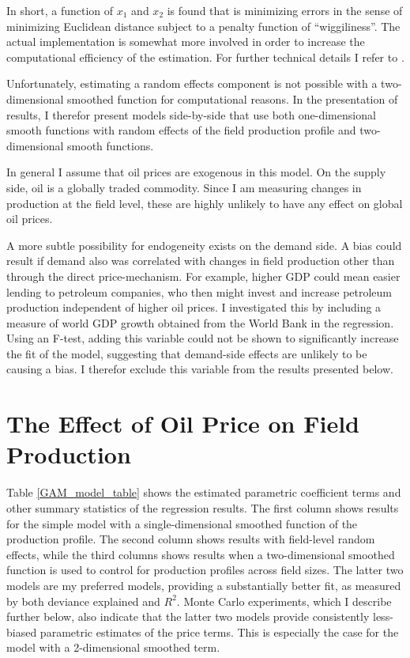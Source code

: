 \documentclass[11pt]{article}
\begin{document}
In short, a function of $x_1$ and $x_2$ is found that is minimizing errors in the sense of minimizing Euclidean distance subject to a penalty function of “wiggiliness”.  The actual implementation is somewhat more involved in order to increase the computational efficiency of the estimation.  For further technical details I refer to \citet{wood_thin_2003}. 

Unfortunately, estimating a random effects component is not possible with a two-dimensional smoothed function for computational reasons.  In the presentation of results, I therefor present models side-by-side that use both one-dimensional smooth functions with random effects of the field production profile and two-dimensional smooth functions.

In general I assume that oil prices are exogenous in this model. On the supply side, oil is a globally traded commodity.  Since I am measuring changes in production at the field level, these are highly unlikely to have any effect on global oil prices.

A more subtle possibility for endogeneity exists on the demand side. A bias could result if demand also was correlated with changes in field production other than through the direct price-mechanism. For example, higher GDP could mean easier lending to petroleum companies, who then might invest and increase petroleum production independent of higher oil prices. I investigated this by including a measure of world GDP growth obtained from the World Bank in the regression. Using an F-test, adding this variable could not be shown to significantly increase the fit of the model, suggesting that demand-side effects are unlikely to be causing a bias. I therefor exclude this variable from the results presented below.

\section{The Effect of Oil Price on Field Production}

Table \ref{GAM_model_table} shows the estimated parametric coefficient terms and other summary statistics of the regression results.  The first column shows results for the simple model with a single-dimensional smoothed function of the production profile.  The second column shows results with field-level random effects, while the third columns shows results when a two-dimensional smoothed function is used to control for production profiles across field sizes. The latter two models are my preferred models, providing a substantially better fit, as measured by both deviance explained and $R^2$. Monte Carlo experiments, which I describe further below, also indicate that the latter two models provide consistently less-biased parametric estimates of the price terms. This is especially the case for the model with a 2-dimensional smoothed term.
\end{document}
